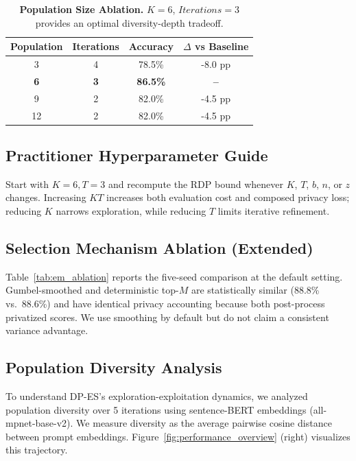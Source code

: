 \begin{table}[t]
\centering
\small
\begin{tabular}{cccc}
\toprule
\textbf{Population} & \textbf{Iterations} & \textbf{Accuracy} & \textbf{$\Delta$ vs Baseline} \\
\midrule
3  & 4 & 78.5\% & -8.0 pp \\
\textbf{6} & \textbf{3} & \textbf{86.5\%} & \textbf{--} \\
9  & 2 & 82.0\% & -4.5 pp \\
12 & 2 & 82.0\% & -4.5 pp \\
\bottomrule
\end{tabular}
\caption{\textbf{Population Size Ablation.} $K=6$, $Iterations=3$ provides an optimal diversity-depth tradeoff.}
\label{tab:pop_ablation}
\end{table}

\subsection{Practitioner Hyperparameter Guide}
\label{sec:appendix:hyperparameter_guide}

\noindent Start with $K=6,T=3$ and recompute the RDP bound whenever $K$, $T$, $b$, $n$, or $z$ changes. Increasing $KT$ increases both evaluation cost and composed privacy loss; reducing $K$ narrows exploration, while reducing $T$ limits iterative refinement.

\subsection{Selection Mechanism Ablation (Extended)}
\label{sec:appendix:em_ablation}

\noindent Table~\ref{tab:em_ablation} reports the five-seed comparison at the default setting. Gumbel-smoothed and deterministic top-$M$ are statistically similar (88.8\% vs.\ 88.6\%) and have identical privacy accounting because both post-process privatized scores. We use smoothing by default but do not claim a consistent variance advantage.

\subsection{Population Diversity Analysis}
\label{sec:appendix:diversity}

\noindent To understand DP-ES's exploration-exploitation dynamics, we analyzed population diversity over 5 iterations using sentence-BERT embeddings (all-mpnet-base-v2). We measure diversity as the average pairwise cosine distance between prompt embeddings. Figure~\ref{fig:performance_overview} (right) visualizes this trajectory.

